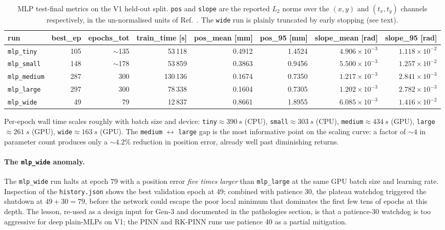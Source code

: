 \documentclass[a4paper,11pt]{article}
\newcommand{\SI}[2]{#1~#2}
\begin{document}
\begin{table}[h]
\centering\small
\caption{MLP test-final metrics on the V1 held-out split. \texttt{pos} and
\texttt{slope} are the reported $L_2$ norms over the $(x,y)$ and $(t_x,t_y)$
channels respectively, in the un-normalised units of
Ref.~\cite{gen1report}. The \texttt{wide} run is plainly truncated by early
stopping (see text).}
\label{gen2old:tab:mlp_res}
\begin{tabular}{lrrrrrrr}
\toprule
run & best\_ep & epochs\_tot & train\_time [s]
    & pos\_mean [mm] & pos\_95 [mm]
    & slope\_mean [rad] & slope\_95 [rad]\\
\midrule
\texttt{mlp\_tiny}   & 105 & $\sim$135 &  53\,118 & 0.4912 & 1.4524 & $4.906\!\times\!10^{-3}$ & $1.118\!\times\!10^{-2}$\\
\texttt{mlp\_small}  & 148 & $\sim$178 &  53\,859 & 0.3863 & 0.9456 & $5.500\!\times\!10^{-3}$ & $1.257\!\times\!10^{-2}$\\
\texttt{mlp\_medium} & 287 & 300       & 130\,136 & 0.1674 & 0.7350 & $1.217\!\times\!10^{-3}$ & $2.841\!\times\!10^{-3}$\\
\texttt{mlp\_large}  & 297 & 300       &  78\,338 & 0.1604 & 0.7305 & $1.202\!\times\!10^{-3}$ & $2.782\!\times\!10^{-3}$\\
\texttt{mlp\_wide}   &  49 &  79       &  12\,837 & 0.8661 & 1.8955 & $6.085\!\times\!10^{-3}$ & $1.416\!\times\!10^{-2}$\\
\bottomrule
\end{tabular}
\end{table}

Per-epoch wall time scales roughly with batch size and device:
\texttt{tiny}${\approx}\SI{390}{s}$ (CPU), \texttt{small}${\approx}\SI{303}{s}$
(CPU), \texttt{medium}${\approx}\SI{434}{s}$ (GPU), \texttt{large}
${\approx}\SI{261}{s}$ (GPU), \texttt{wide}${\approx}\SI{163}{s}$ (GPU). The
\texttt{medium} $\leftrightarrow$ \texttt{large} gap is the most informative
point on the scaling curve: a factor of $\sim\!4$ in parameter count produces
only a $\sim\!4.2\%$ reduction in position error, already well past
diminishing returns.

\paragraph{The \texttt{mlp\_wide} anomaly.}
The \texttt{mlp\_wide} run halts at epoch 79 with a position error
\emph{five times larger} than \texttt{mlp\_large} at the same GPU batch size
and learning rate. Inspection of the \texttt{history.json} shows the best
validation epoch at 49; combined with patience 30, the plateau watchdog
triggered the shutdown at $49+30=79$, before the network could escape the
poor local minimum that dominates the first few tens of epochs at this
depth. The lesson, re-used as a design input for Gen-3 and documented in
the pathologies section, is that a patience-30 watchdog is too aggressive
for deep plain-MLPs on V1; the PINN and RK-PINN runs use patience 40 as
a partial mitigation.
\end{document}
